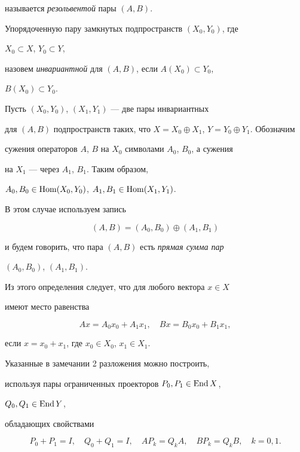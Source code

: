 называется {\it резольвентой} пары $(A,B)$. 


 


Упорядоченную пару замкнутых подпространств $(X_0,Y_0)$, где 


$X_0\subset X$, $Y_0\subset Y$, 


назовем {\it инвариантной} для $(A,B)$, если $A(X_0)\subset Y_0$, 


$B(X_0)\subset Y_0$. 


 


\begin{note} 


Пусть $(X_0,Y_0)$, $(X_1,Y_1)$ --- две пары инвариантных 


для $(A,B)$ подпространств таких, что $X=X_0\oplus X_1$, $Y=Y_0\oplus 


Y_1$. Обозначим 


сужения операторов $A$, $B$ на $X_0$ символами $A_0$, $B_0$, а сужения 


на $X_1$ --- через $A_1$, $B_1$. Таким образом, 


$A_0,B_0\in\operatorname{Hom}(X_0,Y_0)$, $A_1,B_1\in\operatorname{Hom}(X_1,Y_1)$. 


В этом случае используем запись 


\begin{equation} 


(A,B)=(A_0,B_0)\oplus(A_1,B_1) 


\end{equation} 


и будем говорить, что пара $(A,B)$ есть {\it прямая сумма пар} 


$(A_0,B_0)$, $(A_1,B_1)$. 


Из этого определения следует, что для любого вектора $x\in X$ 


имеют место равенства 


$$ 


A x=A_0x_0+A_1x_1,\quad B x=B_0x_0+B_1x_1, 


$$ 


если $x=x_0+x_1$, где $x_0\in X_0$, $x_1\in X_1$. 


\end{note} 


 


\begin{note} 


Указанные в замечании 2 разложения можно построить, 


используя пары ограниченных проекторов $P_0,P_1\in\operatorname{End} X$, 


$Q_0,Q_1\in\operatorname{End} Y$, 


обладающих свойствами 


$$ 


P_0+P_1=I,\quad Q_0+Q_1=I,\quad A P_k=Q_k A,\quad 


B P_k=Q_k B,\quad k=0,1. 


$$ 


\end{note} 


